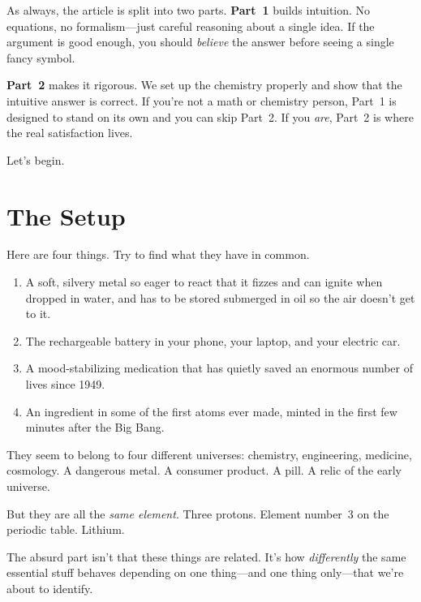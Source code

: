 \documentclass[11pt, letterpaper]{article}
\begin{document}
As always, the article is split into two parts. \textbf{Part~1} builds intuition. No equations, no formalism---just careful reasoning about a single idea. If the argument is good enough, you should \textit{believe} the answer before seeing a single fancy symbol.

\textbf{Part~2} makes it rigorous. We set up the chemistry properly and show that the intuitive answer is correct. If you're not a math or chemistry person, Part~1 is designed to stand on its own and you can skip Part~2. If you \textit{are}, Part~2 is where the real satisfaction lives.

Let's begin.



\section*{The Setup}

Here are four things. Try to find what they have in common.

\begin{enumerate}[nosep]
  \item A soft, silvery metal so eager to react that it fizzes and can ignite when dropped in water, and has to be stored submerged in oil so the air doesn't get to it.
  \item The rechargeable battery in your phone, your laptop, and your electric car.
  \item A mood-stabilizing medication that has quietly saved an enormous number of lives since 1949.
  \item An ingredient in some of the first atoms ever made, minted in the first few minutes after the Big Bang.
\end{enumerate}

They seem to belong to four different universes: chemistry, engineering, medicine, cosmology. A dangerous metal. A consumer product. A pill. A relic of the early universe.

But they are all the \textit{same element}. Three protons. Element number~3 on the periodic table. Lithium.

The absurd part isn't that these things are related. It's how \textit{differently} the same essential stuff behaves depending on one thing---and one thing only---that we're about to identify.

\end{document}
